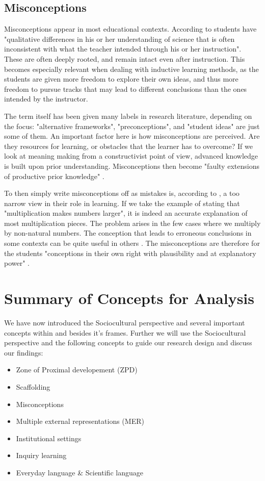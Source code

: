 \subsection{Misconceptions}
Misconceptions appear in most educational contexts. According to \citet{gomez2008elementary} students have "qualitative differences in his or her understanding of science that is often inconsistent with what the teacher intended through his or her instruction". These are often deeply rooted, and remain intact even after instruction. This becomes especially relevant when dealing with inductive learning methods, as the students are given more freedom to explore their own ideas, and thus more freedom to pursue tracks that may lead to different conclusions than the ones intended by the instructor.

The term itself has been given many labels in research literature, depending on the focus: "alternative frameworks", "preconceptions", and "student ideas" are just some of them. An important factor here is how misconceptions are perceived. Are they resources for learning, or obstacles that the learner has to overcome? If we look at meaning making from a constructivist point of view, advanced knowledge is built upon prior understanding. Misconceptions then become "faulty extensions of productive prior knowledge" \citep{smith1994misconceptions}.

To then simply write misconceptions off as mistakes is, according to \citet{smith1994misconceptions}, a too narrow view in their role in learning. If we take the example of stating that "multiplication makes numbers larger", it is indeed an accurate explanation of most multiplication pieces. The problem arises in the few cases where we multiply by non-natural numbers. The conception that leads to erroneous conclusions in some contexts can be quite useful in others \citep{smith1994misconceptions}. The misconceptions are therefore for the students "conceptions in their own right with plausibility and at explanatory power" \citetext{Smith, diSessa \& Roschelle 1993, referenced in \citealp{larkin2012misconceptions}}. 


\section{Summary of Concepts for Analysis}
We have now introduced the Sociocultural perspective and several important concepts within and besides it's frames. Further we will use the Sociocultural perspective and the following concepts to guide our research design and discuss our findings:

\begin{itemize}
\item{Zone of Proximal developement (ZPD)}
\item{Scaffolding}
\item{Misconceptions}
\item{Multiple external representations (MER)}
\item{Institutional settings}
\item{Inquiry learning}
\item{Everyday language \& Scientific language}

\end{itemize}